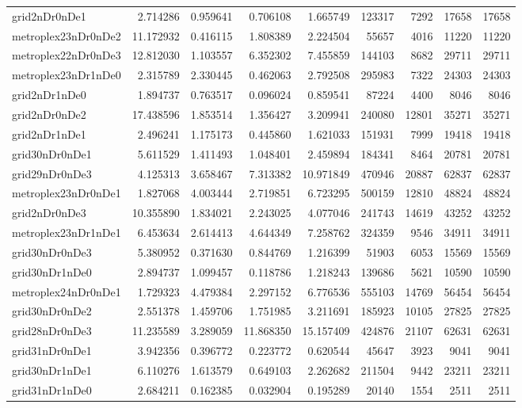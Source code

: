 \begin{longtable}{|l|r|r|r|r|r|r|r|r|}
grid2nDr0nDe1 & 2.714286 & 0.959641 & 0.706108 & 1.665749 & 123317 & 7292 & 17658 & 17658 \\
metroplex23nDr0nDe2 & 11.172932 & 0.416115 & 1.808389 & 2.224504 & 55657 & 4016 & 11220 & 11220 \\
metroplex22nDr0nDe3 & 12.812030 & 1.103557 & 6.352302 & 7.455859 & 144103 & 8682 & 29711 & 29711 \\
metroplex23nDr1nDe0 & 2.315789 & 2.330445 & 0.462063 & 2.792508 & 295983 & 7322 & 24303 & 24303 \\
grid2nDr1nDe0 & 1.894737 & 0.763517 & 0.096024 & 0.859541 & 87224 & 4400 & 8046 & 8046 \\
grid2nDr0nDe2 & 17.438596 & 1.853514 & 1.356427 & 3.209941 & 240080 & 12801 & 35271 & 35271 \\
grid2nDr1nDe1 & 2.496241 & 1.175173 & 0.445860 & 1.621033 & 151931 & 7999 & 19418 & 19418 \\
grid30nDr0nDe1 & 5.611529 & 1.411493 & 1.048401 & 2.459894 & 184341 & 8464 & 20781 & 20781 \\
grid29nDr0nDe3 & 4.125313 & 3.658467 & 7.313382 & 10.971849 & 470946 & 20887 & 62837 & 62837 \\
metroplex23nDr0nDe1 & 1.827068 & 4.003444 & 2.719851 & 6.723295 & 500159 & 12810 & 48824 & 48824 \\
grid2nDr0nDe3 & 10.355890 & 1.834021 & 2.243025 & 4.077046 & 241743 & 14619 & 43252 & 43252 \\
metroplex23nDr1nDe1 & 6.453634 & 2.614413 & 4.644349 & 7.258762 & 324359 & 9546 & 34911 & 34911 \\
grid30nDr0nDe3 & 5.380952 & 0.371630 & 0.844769 & 1.216399 & 51903 & 6053 & 15569 & 15569 \\
grid30nDr1nDe0 & 2.894737 & 1.099457 & 0.118786 & 1.218243 & 139686 & 5621 & 10590 & 10590 \\
metroplex24nDr0nDe1 & 1.729323 & 4.479384 & 2.297152 & 6.776536 & 555103 & 14769 & 56454 & 56454 \\
grid30nDr0nDe2 & 2.551378 & 1.459706 & 1.751985 & 3.211691 & 185923 & 10105 & 27825 & 27825 \\
grid28nDr0nDe3 & 11.235589 & 3.289059 & 11.868350 & 15.157409 & 424876 & 21107 & 62631 & 62631 \\
grid31nDr0nDe1 & 3.942356 & 0.396772 & 0.223772 & 0.620544 & 45647 & 3923 & 9041 & 9041 \\
grid30nDr1nDe1 & 6.110276 & 1.613579 & 0.649103 & 2.262682 & 211504 & 9442 & 23211 & 23211 \\
grid31nDr1nDe0 & 2.684211 & 0.162385 & 0.032904 & 0.195289 & 20140 & 1554 & 2511 & 2511 \\

\end{longtable}
